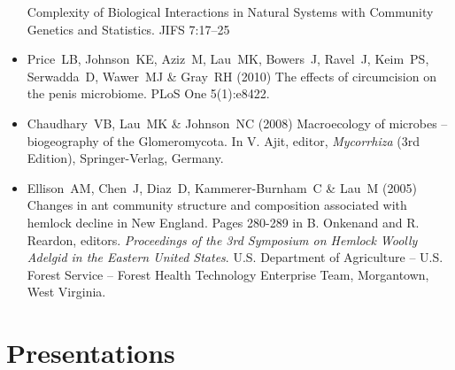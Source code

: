 \documentclass[a4paper]{article}
\begin{document}
\begin{itemize}
  Complexity of Biological Interactions in Natural Systems with
  Community Genetics and Statistics. JIFS 7:17--25
\item
  Price~LB, Johnson~KE, Aziz~M, Lau~MK, Bowers~J, Ravel~J, Keim~PS,
  Serwadda~D, Wawer~MJ \& Gray~RH (2010) The effects of circumcision on
  the penis microbiome. PLoS One 5(1):e8422.
\item
  Chaudhary~VB, Lau~MK \& Johnson~NC (2008) Macroecology of microbes --
  biogeography of the Glomeromycota. In V. Ajit, editor,
  \emph{Mycorrhiza} (3rd Edition), Springer-Verlag, Germany.
\item
  Ellison~AM, Chen~J, Diaz~D, Kammerer-Burnham~C \& Lau~M (2005) Changes
  in ant community structure and composition associated with hemlock
  decline in New England. Pages 280-289 in B. Onkenand and R. Reardon,
  editors. \emph{Proceedings of the 3rd Symposium on Hemlock Woolly
  Adelgid in the Eastern United States}. U.S. Department of Agriculture
  -- U.S. Forest Service -- Forest Health Technology Enterprise Team,
  Morgantown, West Virginia.
\end{itemize}

\section{Presentations}\label{presentations}
\end{document}
